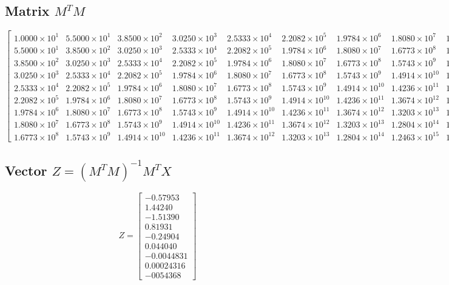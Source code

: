 \documentclass{article}
\begin{document}
\subsection*{Matrix \(M^TM\)}
{\tiny
\[
\begin{bmatrix}
1.0000\times 10^1 & 5.5000\times 10^1 & 3.8500\times 10^2 & 3.0250\times 10^3 & 2.5333\times 10^4 & 2.2082\times 10^5 & 1.9784\times 10^6 & 1.8080\times 10^7 & 1.6773\times 10^8 \\
5.5000\times 10^1 & 3.8500\times 10^2 & 3.0250\times 10^3 & 2.5333\times 10^4 & 2.2082\times 10^5 & 1.9784\times 10^6 & 1.8080\times 10^7 & 1.6773\times 10^8 & 1.5743\times 10^9 \\
3.8500\times 10^2 & 3.0250\times 10^3 & 2.5333\times 10^4 & 2.2082\times 10^5 & 1.9784\times 10^6 & 1.8080\times 10^7 & 1.6773\times 10^8 & 1.5743\times 10^9 & 1.4914\times 10^{10} \\
3.0250\times 10^3 & 2.5333\times 10^4 & 2.2082\times 10^5 & 1.9784\times 10^6 & 1.8080\times 10^7 & 1.6773\times 10^8 & 1.5743\times 10^9 & 1.4914\times 10^{10} & 1.4236\times 10^{11} \\
2.5333\times 10^4 & 2.2082\times 10^5 & 1.9784\times 10^6 & 1.8080\times 10^7 & 1.6773\times 10^8 & 1.5743\times 10^9 & 1.4914\times 10^{10} & 1.4236\times 10^{11} & 1.3674\times 10^{12} \\
2.2082\times 10^5 & 1.9784\times 10^6 & 1.8080\times 10^7 & 1.6773\times 10^8 & 1.5743\times 10^9 & 1.4914\times 10^{10} & 1.4236\times 10^{11} & 1.3674\times 10^{12} & 1.3203\times 10^{13} \\
1.9784\times 10^6 & 1.8080\times 10^7 & 1.6773\times 10^8 & 1.5743\times 10^9 & 1.4914\times 10^{10} & 1.4236\times 10^{11} & 1.3674\times 10^{12} & 1.3203\times 10^{13} & 1.2804\times 10^{14} \\
1.8080\times 10^7 & 1.6773\times 10^8 & 1.5743\times 10^9 & 1.4914\times 10^{10} & 1.4236\times 10^{11} & 1.3674\times 10^{12} & 1.3203\times 10^{13} & 1.2804\times 10^{14} & 1.2463\times 10^{15} \\
1.6773\times 10^8 & 1.5743\times 10^9 & 1.4914\times 10^{10} & 1.4236\times 10^{11} & 1.3674\times 10^{12} & 1.3203\times 10^{13} & 1.2804\times 10^{14} & 1.2463\times 10^{15} & 1.2171\times 10^{16}
\end{bmatrix}
\]
}

\subsection*{Vector \(Z = (M^T M)^{-1}M^TX\)}
\[
Z = \begin{bmatrix}
-0.57953 \\
1.44240 \\
-1.51390 \\
0.81931 \\
-0.24904 \\
0.044040 \\
-0.0044831 \\
0.00024316 \\
-0054368
\end{bmatrix}
\]
\end{document}
